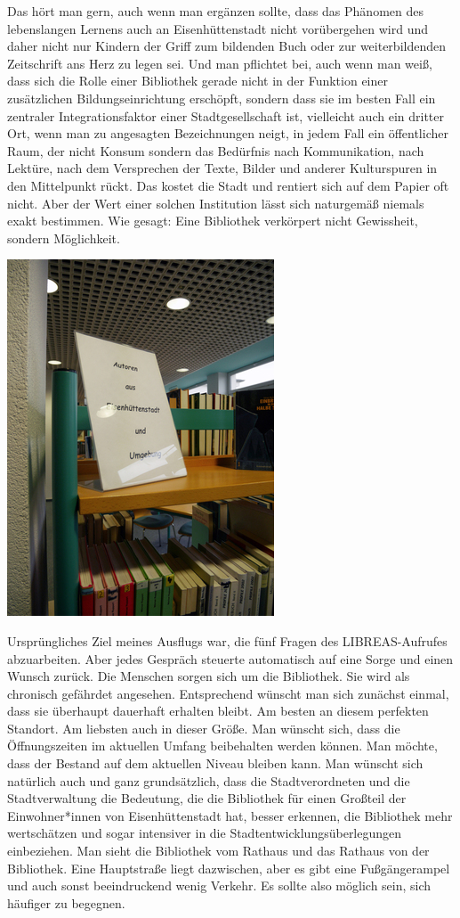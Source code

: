 \documentclass[a4paper,
fontsize=11pt,
oneside,
numbers=noperiodatend,
parskip=half-,
bibliography=totoc,
final
]{scrartcl}
\begin{document}
Das hört man gern, auch wenn man ergänzen sollte, dass das Phänomen des
lebenslangen Lernens auch an Eisenhüttenstadt nicht vorübergehen wird
und daher nicht nur Kindern der Griff zum bildenden Buch oder zur
weiterbildenden Zeitschrift ans Herz zu legen sei. Und man pflichtet
bei, auch wenn man weiß, dass sich die Rolle einer Bibliothek gerade
nicht in der Funktion einer zusätzlichen Bildungseinrichtung erschöpft,
sondern dass sie im besten Fall ein zentraler Integrationsfaktor einer
Stadtgesellschaft ist, vielleicht auch ein dritter Ort, wenn man zu
angesagten Bezeichnungen neigt, in jedem Fall ein öffentlicher Raum, der
nicht Konsum sondern das Bedürfnis nach Kommunikation, nach Lektüre,
nach dem Versprechen der Texte, Bilder und anderer Kulturspuren in den
Mittelpunkt rückt. Das kostet die Stadt und rentiert sich auf dem Papier
oft nicht. Aber der Wert einer solchen Institution lässt sich naturgemäß
niemals exakt bestimmen. Wie gesagt: Eine Bibliothek verkörpert nicht
Gewissheit, sondern Möglichkeit.

\includegraphics{img/image_5.jpg}

Ursprüngliches Ziel meines Ausflugs war, die fünf Fragen des
LIBREAS-Aufrufes abzuarbeiten. Aber jedes Gespräch steuerte automatisch
auf eine Sorge und einen Wunsch zurück. Die Menschen sorgen sich um die
Bibliothek. Sie wird als chronisch gefährdet angesehen. Entsprechend
wünscht man sich zunächst einmal, dass sie überhaupt dauerhaft erhalten
bleibt. Am besten an diesem perfekten Standort. Am liebsten auch in
dieser Größe. Man wünscht sich, dass die Öffnungszeiten im aktuellen
Umfang beibehalten werden können. Man möchte, dass der Bestand auf dem
aktuellen Niveau bleiben kann. Man wünscht sich natürlich auch und ganz
grundsätzlich, dass die Stadtverordneten und die Stadtverwaltung die
Bedeutung, die die Bibliothek für einen Großteil der Einwohner*innen von
Eisenhüttenstadt hat, besser erkennen, die Bibliothek mehr wertschätzen
und sogar intensiver in die Stadtentwicklungsüberlegungen einbeziehen.
Man sieht die Bibliothek vom Rathaus und das Rathaus von der Bibliothek.
Eine Hauptstraße liegt dazwischen, aber es gibt eine Fußgängerampel und
auch sonst beeindruckend wenig Verkehr. Es sollte also möglich sein,
sich häufiger zu begegnen.
\end{document}
